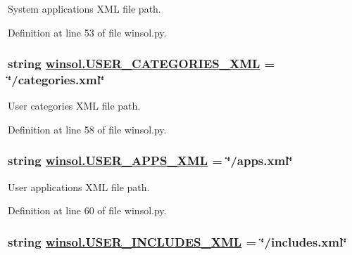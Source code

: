 System applications XML file path. 



Definition at line 53 of file winsol.py.\hypertarget{namespacewinsol_329896e2d91a81d585750db3b5019e3a}{
\subsubsection[USER\_\-CATEGORIES\_\-XML]{\setlength{\rightskip}{0pt plus 5cm}string \hyperlink{namespacewinsol_329896e2d91a81d585750db3b5019e3a}{winsol.USER\_\-CATEGORIES\_\-XML} = \char`\"{}/categories.xml\char`\"{}}}
\label{namespacewinsol_329896e2d91a81d585750db3b5019e3a}


User categories XML file path. 



Definition at line 58 of file winsol.py.\hypertarget{namespacewinsol_c33a1cb562b690cab5c72abf5dc6889a}{
\subsubsection[USER\_\-APPS\_\-XML]{\setlength{\rightskip}{0pt plus 5cm}string \hyperlink{namespacewinsol_c33a1cb562b690cab5c72abf5dc6889a}{winsol.USER\_\-APPS\_\-XML} = \char`\"{}/apps.xml\char`\"{}}}
\label{namespacewinsol_c33a1cb562b690cab5c72abf5dc6889a}


User applications XML file path. 



Definition at line 60 of file winsol.py.\hypertarget{namespacewinsol_f5b54eec64d2e3ce6c6b15a1fbc615dd}{
\subsubsection[USER\_\-INCLUDES\_\-XML]{\setlength{\rightskip}{0pt plus 5cm}string \hyperlink{namespacewinsol_f5b54eec64d2e3ce6c6b15a1fbc615dd}{winsol.USER\_\-INCLUDES\_\-XML} = \char`\"{}/includes.xml\char`\"{}}}
\label{namespacewinsol_f5b54eec64d2e3ce6c6b15a1fbc615dd}


